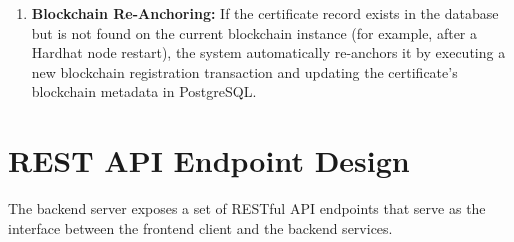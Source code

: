 \begin{enumerate}
    \item \textbf{Blockchain Re-Anchoring:} If the certificate record exists in the database but is not found on the current blockchain instance (for example, after a Hardhat node restart), the system automatically re-anchors it by executing a new blockchain registration transaction and updating the certificate's blockchain metadata in PostgreSQL.
\end{enumerate}

\section{REST API Endpoint Design}

The backend server exposes a set of RESTful API endpoints that serve as the interface between the frontend client and the backend services.

